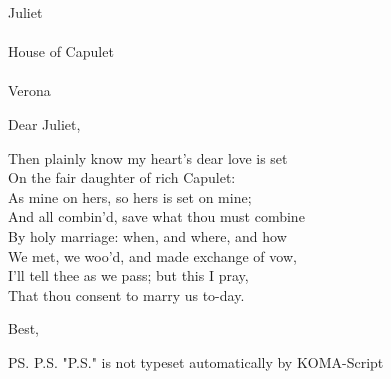 \documentclass[foldmarks=false,refline=dateleft,fromrule=afteraddress,enlargefirstpage=on,fontsize=12pt,fromalign=center,subject=left,parskip=full]{scrlttr2}
\date{June  4, 2015.}
\begin{document}

\begin{letter}{%
Juliet \\\\
House of Capulet \\\\
Verona \\}

\opening{Dear Juliet,}

Then plainly know my heart's dear love is set \\
On the fair daughter of rich Capulet: \\
As mine on hers, so hers is set on mine; \\
And all combin'd, save what thou must combine \\
By holy marriage: when, and where, and how \\
We met, we woo'd, and made exchange of vow, \\
I'll tell thee as we pass; but this I pray, \\
That thou consent to marry us to-day. \\

\closing{Best,}

\ps{P.S. "P.S." is not typeset automatically by KOMA-Script \\}
\end{letter}

\end{document}

